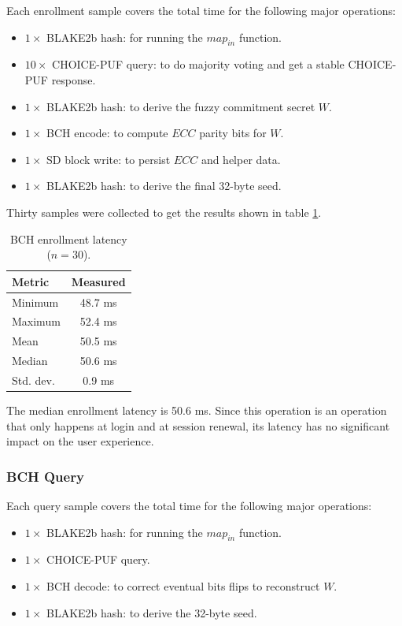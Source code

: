 Each enrollment sample covers the total time for the following major operations:
\begin{itemize}
    \item $1\times$ BLAKE2b hash: for running the $map_{in}$ function.
    \item $10\times$ CHOICE-PUF query: to do majority voting and get a stable CHOICE-PUF response.
    \item $1\times$ BLAKE2b hash: to derive the fuzzy commitment secret $W$.
    \item $1\times$ BCH encode: to compute $ECC$ parity bits for $W$.
    \item $1\times$ SD block write: to persist $ECC$ and helper data.
    \item $1\times$ BLAKE2b hash: to derive the final 32-byte seed.
\end{itemize}

Thirty samples were collected to get the results shown in table \ref{tab:perf-bch-enroll}. 
\begin{table}[ht!]
\centering
\caption{BCH enrollment latency ($n=30$).}
\begin{tabular}{lc}
\hline
\textbf{Metric} & \textbf{Measured} \\
\hline
Minimum      & 48.7 ms \\
Maximum      & 52.4 ms \\
Mean         & 50.5 ms \\
Median       & 50.6 ms \\
Std. dev.  &  0.9 ms \\
\hline
\end{tabular}
\label{tab:perf-bch-enroll}
\end{table}

The median enrollment latency is 50.6 ms. Since this operation is an operation that only happens at login and at session renewal, its latency has no significant impact on the user experience.

\subsubsection{BCH Query}
Each query sample covers the total time for the following major operations:
\begin{itemize}
    \item $1\times$ BLAKE2b hash: for running the $map_{in}$ function.
    \item $1\times$ CHOICE-PUF query.
    \item $1\times$ BCH decode: to correct eventual bits flips to reconstruct $W$.
    \item $1\times$ BLAKE2b hash: to derive the 32-byte seed.
\end{itemize}

